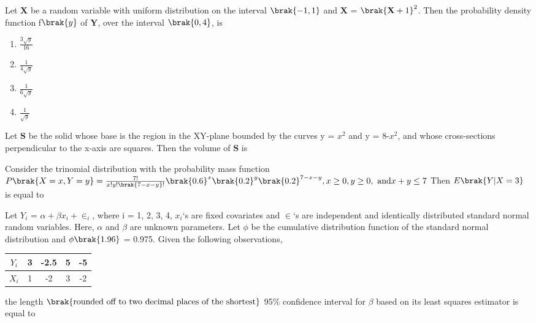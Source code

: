 \iffalse
\title{Assignment}
\author{EE24BTECH11038}
\section{st}
\chapter{2019}
\fi
\item Let $\mathbf{X}$ be a random variable with uniform distribution on the interval $\brak{-1,1}$ and $\mathbf{X}$ = $\brak{\mathbf{X}+1}^2$. Then the probability density function f$\brak{y}$ of $\mathbf{Y}$, over the interval $\brak{0,4}$, is
\begin{enumerate}
    \item $\frac{3\sqrt{y}}{16}$
    \item $\frac{1}{4\sqrt{y}}$
    \item $\frac{1}{6\sqrt{y}}$
    \item $\frac{1}{\sqrt{y}}$
\end{enumerate}
\bigskip
\item Let $\mathbf{S}$ be the solid whose base is the region in the XY-plane bounded by the curves y = $x^2$ and y = 8-$x^2$, and whose cross-sections perpendicular to the x-axis are squares. Then the volume of $\mathbf{S}$  is
\bigskip
\item Consider the trinomial distribution with the probability mass function $P\brak{X=x,Y=y} = \frac{7!}{x!y!\brak{7-x-y}!}\brak{0.6}^x\brak{0.2}^{y}\brak{0.2}^{7-x-y},x\geq0,y\geq0,\,\, \text{and} x+y\leq 7$ Then $E\brak{Y|X=3}$ is equal to 
\bigskip
\item Let $Y_{i}$ = $\alpha+\beta x_{i}+\in_{i}$, where i = 1, 2, 3, 4, $x_{i}$`s are fixed covariates and $\in$`s are independent and identically distributed standard normal random variables. Here, $\alpha$ and $\beta$ are unknown parameters. Let $\phi$ be the cumulative distribution function of the standard normal distribution and $\phi \brak{1.96}$ = 0.975. Given the following observations,\\
\begin{tabular}{|c|c|c|c|c|}
\hline
$Y_{i}$ & 3 & -2.5 & 5 & -5\\
\hline
$X_{i}$ & 1 & -2 & 3 & -2 \\
\hline
\end{tabular}
the length $\brak{\text{rounded off to two decimal places of the shortest}}$ 95\% confidence interval for $\beta$ based on its least squares estimator is equal to
\bigskip
